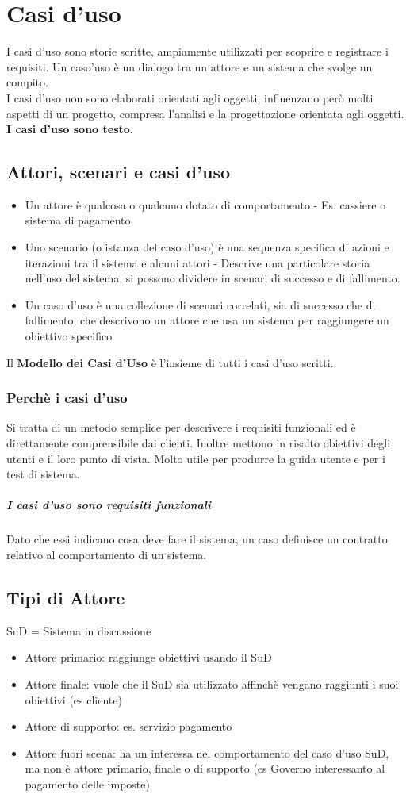 \chapter{Casi d'uso}
I casi d'uso sono storie scritte, ampiamente utilizzati per scoprire e registrare
i requisiti. Un caso'uso è un dialogo tra un attore e un sistema che svolge un compito.
\\ I casi d'uso non sono elaborati orientati agli oggetti, influenzano però molti aspetti
di un progetto, compresa l'analisi e la progettazione orientata agli oggetti.
\textbf{I casi d'uso sono testo}.
\section{Attori, scenari e casi d'uso}
\begin{itemize}
    \item Un attore è qualcosa o qualcuno dotato di comportamento - Es. cassiere
    o sistema di pagamento 
    \item Uno scenario (o istanza del caso d'uso) è una sequenza specifica di azioni
    e iterazioni tra il sistema e alcuni attori - Descrive una particolare storia nell'uso
    del sistema, si possono dividere in scenari di successo e di fallimento.
    \item Un caso d'uso è una collezione di scenari correlati, sia di successo che
    di fallimento, che descrivono un attore che usa un sistema per raggiungere un
    obiettivo specifico
\end{itemize}
Il \textbf{Modello dei Casi d'Uso} è l'insieme di tutti i casi d'uso scritti.
\subsection{Perchè i casi d'uso}
Si tratta di un metodo semplice per descrivere i requisiti funzionali ed è
direttamente comprensibile dai clienti. Inoltre mettono in risalto obiettivi degli utenti
e il loro punto di vista. Molto utile per produrre la guida utente e per i test di sistema.
\paragraph*{I casi d'uso sono requisiti funzionali} Dato che essi indicano cosa
deve fare il sistema, un caso definisce un contratto relativo al comportamento
di un sistema.
\section{Tipi di Attore}
SuD = Sistema in discussione
\begin{itemize}
    \item Attore primario: raggiunge obiettivi usando il SuD
    \item Attore finale: vuole che il SuD sia utilizzato affinchè vengano raggiunti
    i suoi obiettivi (es cliente)
    \item Attore di supporto: es. servizio pagamento
    \item Attore fuori scena: ha un interessa nel comportamento del caso d'uso SuD, ma non
    è attore primario, finale o di supporto (es Governo interessanto al pagamento delle imposte)
\end{itemize}
